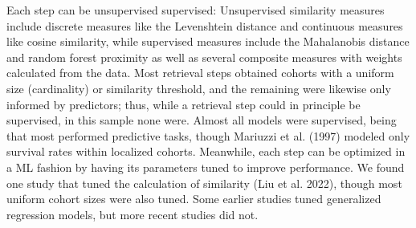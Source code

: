 \documentclass{article}
\begin{document}
Each step can be unsupervised supervised: Unsupervised similarity
measures include discrete measures like the Levenshtein distance and
continuous measures like cosine similarity, while supervised measures
include the Mahalanobis distance and random forest proximity as well as
several composite measures with weights calculated from the data. Most
retrieval steps obtained cohorts with a uniform size (cardinality) or
similarity threshold, and the remaining were likewise only informed by
predictors; thus, while a retrieval step could in principle be
supervised, in this sample none were. Almost all models were supervised,
being that most performed predictive tasks, though Mariuzzi et al.
(1997) modeled only survival rates within localized cohorts. Meanwhile,
each step can be optimized in a ML fashion by having its parameters
tuned to improve performance. We found one study that tuned the
calculation of similarity (Liu et al. 2022), though most uniform cohort
sizes were also tuned. Some earlier studies tuned generalized regression
models, but more recent studies did not.

\small
\end{document}
